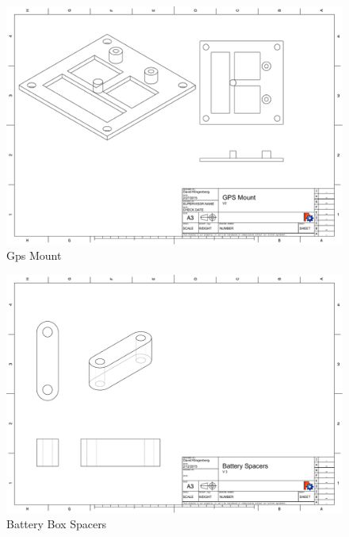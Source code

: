 \documentclass[pdftex,11pt]{article}
\begin{document}
\begin{figure}[!h]
	\centering
		\includegraphics[width=1\textwidth]{./graphics/gps_mountV2-eps-converted-to.pdf}
	\caption{Gps Mount}
	\label{fig:gpsmount}
\end{figure}

\begin{figure}[!h]
	\centering
		\includegraphics[width=1\textwidth]{./graphics/spacers_battery-eps-converted-to.pdf}
	\caption{Battery Box Spacers}
	\label{fig:batteryspacers}
\end{figure}
\end{document}
